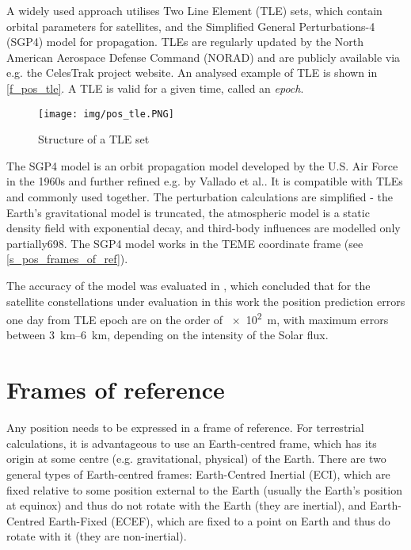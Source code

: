 A widely used approach utilises Two Line Element (TLE) sets, which contain orbital parameters for satellites, and the Simplified General Perturbations-4 (SGP4) model for propagation. TLEs are regularly updated by the North American Aerospace Defense Command (NORAD) and are publicly available via e.g. the CelesTrak project website\cite{des11}. An analysed example of TLE is shown in \autoref{f_pos_tle}. A TLE is valid for a given time, called an \textit{epoch}.

\begin{figure}
    \centering
    \texttt{[image: img/pos\_tle.PNG]}
    \caption{Structure of a TLE set\cite{pos06}}
    \label{f_pos_tle}
\end{figure}

The SGP4 model is an orbit propagation model developed by the U.S. Air Force in the 1960s and further refined e.g. by Vallado et al.\cite{des06}. It is compatible with TLEs and commonly used together. The perturbation calculations are simplified - the Earth’s gravitational model is truncated, the atmospheric model is a static density field with exponential decay, and third-body influences are modelled only partially\citep{pos01}{698}. The SGP4 model works in the TEME coordinate frame (see \autoref{s_pos_frames_of_ref}).

The accuracy of the model was evaluated in \cite{pos07}, which concluded that for the satellite constellations under evaluation in this work the position prediction errors one day from TLE epoch are on the order of \qty{e2}{m}, with maximum errors between \qtyrange{3}{6}{km}, depending on the intensity of the Solar flux.



\section{Frames of reference}
\label{s_pos_frames_of_ref}
Any position needs to be expressed in a frame of reference. For terrestrial calculations, it is advantageous to use an Earth-centred frame, which has its origin at some centre (e.g. gravitational, physical) of the Earth. There are two general types of Earth-centred frames: Earth-Centred Inertial (ECI), which are fixed relative to some position external to the Earth (usually the Earth's position at equinox) and thus do not rotate with the Earth (they are inertial), and Earth-Centred Earth-Fixed (ECEF), which are fixed to a point on Earth and thus do rotate with it (they are non-inertial).

